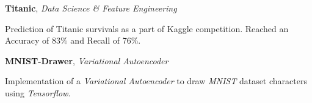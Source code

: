 \documentclass[margin, 10pt]{res} %
\begin{document}
\textbf{Titanic}, 
\textit{Data Science \& Feature Engineering}
\begin{innerlist}
	\item Prediction of Titanic survivals as a part of Kaggle competition. Reached an\\ Accuracy of 83\% and Recall of 76\%. \href{https://github.com/aligholamee/Titanic}{\hfill{\UrlFont[code]}}
\end{innerlist}

\textbf{MNIST-Drawer}, 
\textit{Variational Autoencoder}
\begin{innerlist}
	\item Implementation of a \textit{Variational Autoencoder} to draw \textit{MNIST} dataset characters\\ using \textit{Tensorflow}. \href{https://github.com/aligholamee/MNIST-Drawer}{\hfill{\UrlFont[code]}}
\end{innerlist}
\end{document}
